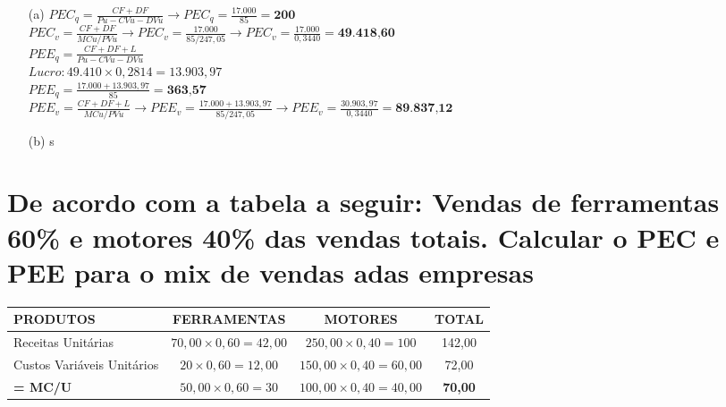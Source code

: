 \documentclass[report]{uftex}
\begin{document}
\begin{itemize}
	
\item[(a)] $PEC_q = \frac{CF + DF}{Pu-CVu-DVu} \rightarrow PEC_q = \frac{17.000}{85} = \textbf{200}$ \\

$PEC_v = \frac{CF + DF}{MCu/PVu} \rightarrow PEC_v = \frac{17.000}{85/247,05} \rightarrow PEC_v = \frac{17.000}{0,3440} = \textbf{49.418,60}$\\

$PEE_q = \frac{CF + DF + L}{Pu - CVu - DVu}$ \\
$Lucro: 49.410 \times 0,2814 = 13.903,97$ \\
$PEE_q = \frac{17.000 + 13.903,97}{85} = \textbf{363,57}$ \\

$PEE_v = \frac{CF + DF + L}{MCu/PVu} \rightarrow PEE_v = \frac{17.000 + 13.903,97}{85/247,05} \rightarrow PEE_v = \frac{30.903,97}{0,3440} = \textbf{89.837,12}$

\item [(b)] s

\end{itemize}	

\section{De acordo com a tabela a seguir: Vendas de ferramentas 60\% e motores 40\% das vendas totais. Calcular o PEC e PEE para o mix de vendas adas empresas}

\begin{table}[h]
	\centering
	\begin{tabular}{l|c|c|c}
		\hline
		PRODUTOS & FERRAMENTAS & MOTORES & TOTAL \\ 
		\hline
		Receitas Unitárias & $70,00 \times 0,60 = 42,00$  & $250,00 \times 0,40 = 100$ & 142,00 \\
		\hline
		Custos Variáveis Unitários & $20 \times 0,60 = 12,00$ & $150,00 \times 0,40 = 60,00$ & 72,00 \\
		\textbf{= MC/U} & $50,00 \times 0,60 = 30$ & $100,00 \times 0,40 = 40,00$ & \textbf{70,00} \\
		\hline
	\end{tabular}
\end{table}
\end{document}
